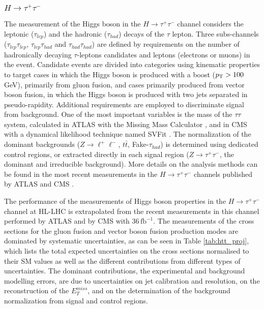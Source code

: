 


\subsubsection{$H \to \tau^{+}\tau^{-}$}
The measurement of the Higgs boson  in the $H \to \tau^{+}\tau^{-}$ channel considers the leptonic ($\tau_{lep}$) and the hadronic ($\tau_{had}$) decays of the $\tau$ lepton. Three subs-channels ($\tau_{lep}\tau_{lep}$, $\tau_{lep}\tau_{had}$ and $\tau_{had}\tau_{had}$) are defined by requirements on the number of hadronically decaying $\tau$-leptons candidates and leptons (electrons or muons) in the event.
Candidate events are divided into categories using kinematic properties to target cases in which the Higgs boson is produced with a  boost ($p\sb{\scriptstyle\mathrm{T}} > 100$ GeV), primarily from gluon  fusion, and cases primarily produced from vector boson fusion, in which the Higgs boson is produced with two jets separated in pseudo-rapidity. Additional requirements are employed to discriminate signal from background. One of the most important variables is the mass of the $\tau\tau$ system, calculated in ATLAS with the Missing Mass Calculator \cite{Elagin:2010aw}, and in CMS with a  dynamical likelihood technique named SVFit \cite{Bianchini:2014vza}.
The normalization of the dominant backgrounds ($Z\to\ell^{+}\ell^{-}$, $t\bar{t}$, Fake-$\tau_{had}$) is determined using dedicated control regions, or extracted directly in each signal region ($Z\to\tau^{+}\tau^{-}$, the dominant and irreducible background).  More details on the analysis methods can be found in the most recent measurements in the  $H \to \tau^{+}\tau^{-}$ channels published by ATLAS \cite{Aaboud:2018pen} and CMS \cite{Sirunyan:2017khh}.

The performance of the measurements of Higgs boson properties in the $H \to \tau^{+}\tau^{-}$ channel at HL-LHC is extrapolated from the recent measurements in this channel performed by ATLAS \cite{ATLAS-CONF-2018-021} and by CMS \cite{Sirunyan:2017khh} with 36\,$\mathrm{fb}^{-1}$. 
The measurements of the cross sections for the gluon fusion and vector boson fusion production modes are dominated by systematic uncertainties, as can be seen in Table \ref{tab:htt_proj}, which  lists the total expected uncertainties on the cross sections normalised to their SM values as well as  the different contributions from different types of uncertainties. 
The dominant contributions, the experimental and background modelling errors, are due to uncertainties on jet calibration and resolution, on the reconstruction of the $E_{T}^{miss}$, and on the determination of the background normalization from signal and control regions.

